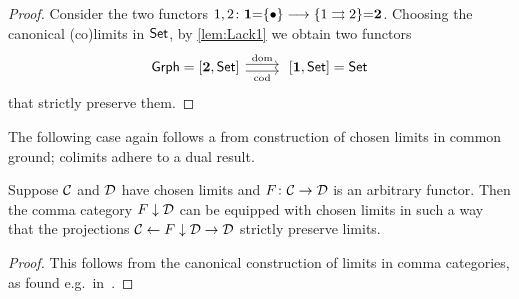\documentclass{amsart}
\begin{document}
\begin{proof}
 Consider the two functors $1,2\colon\mathbf{1}{=}\{\bullet\}\longrightarrow\{1\rightrightarrows2\}{=}\mathbf{2}$. Choosing the canonical (co)limits in $\mathsf{Set}$, by \cref{lem:Lack1} we obtain two functors
\begin{displaymath}
\begin{tikzcd}
 \Grph=[\two,\Set]\ar[r,shift left,"\mathrm{dom}"]\ar[r,shift right,"\mathrm{cod}"'] & \;[\one,\Set]=\Set
 \end{tikzcd}
\end{displaymath}
that strictly preserve them.
\end{proof}

The following case again follows a from construction of chosen limits in common ground; colimits adhere to a dual result.
\begin{lem}
Suppose $\mathcal{C}$ and $\mathcal{D}$ have chosen limits and $F\colon\mathcal{C}\to\mathcal{D}$ is an arbitrary functor. Then the comma category $F\downarrow\mathcal{D}$ can be equipped with chosen limits in such a way that the projections $\mathcal{C}\leftarrow F\downarrow\mathcal{D}\to\mathcal{D}$ strictly preserve limits.
\end{lem}

\begin{proof}
 This follows from the canonical construction of limits in comma categories, as found e.g.\ in~\cite[\S 2.16]{Handbook1}.
\end{proof}
\end{document}
